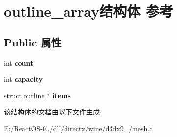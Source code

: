 \hypertarget{structoutline__array}{}\section{outline\+\_\+array结构体 参考}
\label{structoutline__array}
\subsection*{Public 属性}
\begin{DoxyCompactItemize}
\item 
\mbox{\label{structoutline__array_ac3162679751c3406997dfc3234f304e7}} 
int {\bfseries count}
\item 
\mbox{\label{structoutline__array_a48e912d9bad7d929fd326f4386782fc9}} 
int {\bfseries capacity}
\item 
\mbox{\label{structoutline__array_af2e22372b9ac959032ca21702c2790c1}} 
\hyperlink{interfacestruct}{struct} \hyperlink{structoutline}{outline} $\ast$ {\bfseries items}
\end{DoxyCompactItemize}


该结构体的文档由以下文件生成\+:\begin{DoxyCompactItemize}
\item 
E\+:/\+React\+O\+S-\/0../dll/directx/wine/d3dx9\+\_/mesh.\+c\end{DoxyCompactItemize}
